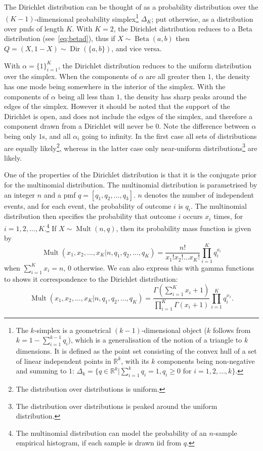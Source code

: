The Dirichlet distribution can be thought of as a probability distribution over the $(K-1)$-dimensional probability simplex\footnote{The $k$-simplex is a geometrical $(k-1)$-dimensional object ($k$ follows from $k=1-\sum_{i=1}^{k-1} q_i$), which is a generalisation of the notion of a triangle to $k$ dimensions. It is defined as the point set consisting of the convex hull of a set of linear independent points in $\mathbb{R}^k$, with its $k$ components being non-negative and summing to $1$: $\Delta_k = \{q\in\mathbb{R}^k|\sum_{i=1}^k q_i=1,q_i\geq0\text{ for }i=1,2,\ldots,k\}$.} $\Delta_K$; put otherwise, as a distribution over pmfs of length $K$. With $K=2$, the Dirichlet distribution reduces to a Beta distribution (see~\cref{eq:betad}), thus if $X\sim\operatorname{Beta}(a,b)$ then $Q=(X,1-X)\sim\operatorname{Dir}(\{a,b\})$, and vice versa.

With $\alpha = \{1\}_{i=1}^K$, the Dirichlet distribution reduces to the uniform distribution over the simplex. When the components of $\alpha$ are all greater then $1$, the density has one mode being somewhere in the interior of the simplex. With the components of $\alpha$ being all less than $1$, the density has sharp peaks around the edges of the simplex. However it should be noted that the support of the Dirichlet is open, and does not include the edges of the simplex, and therefore a component drawn from a Dirichlet will never be $0$. Note the difference between $\alpha$ being only $1$s, and all $\alpha_i$ going to infinity. In the first case all sets of distributions are equally likely\footnote{The distribution over distributions is uniform.}, whereas in the latter case only near-uniform distributions\footnote{The distribution over distributions is peaked around the uniform distribution.} are likely.

One of the properties of the Dirichlet distribution is that it is the conjugate prior for the multinomial distribution. The multinomial distribution is parametrised by an integer $n$ and a pmf $q = [q_1, q_2, \ldots, q_3]$. $n$ denotes the number of independent events, and for each event, the probability of outcome $i$ is $q_i$. The multinomial distribution then specifies the probability that outcome $i$ occurs $x_i$ times, for $i=1,2,\ldots,K$.\footnote{The multinomial distribution can model the probability of an $n$-sample empirical histogram, if each sample is drawn iid from $q$.} If $X\sim\operatorname{Mult}(n,q)$, then its probability mass function is given by
\begin{equation}
	\operatorname{Mult}(x_1,x_2,\ldots,x_K|n, q_1,q_2,\ldots,q_K) = \frac{n!}{x_1!x_2!\ldots x_K!}\prod_{i=1}^K q_i^{x_i}
\end{equation}
when $\sum_{i=1}^K x_i = n$, $0$ otherwise. We can also express this with gamma functions to shows it correspondence to the Dirichlet distribution:
\begin{equation}
	\operatorname{Mult}(x_1, x_2,\ldots,x_K|n, q_1,q_2,\ldots,q_K) = \frac{\Gamma(\sum_{i=1}^K x_i+1)}{\prod_{i=1}^K \Gamma(x_i+1)}\prod_{i=1}^K q_i^{x_1}.
\end{equation}

